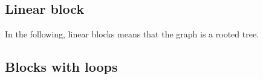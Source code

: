 



\subsection{Linear block}

In the following, linear blocks means that the graph is a rooted tree.

\subsection{Blocks with loops}

